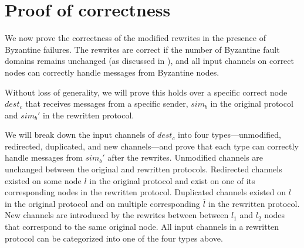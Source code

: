 \section{Proof of correctness}
\label{sec:proofs}
We now prove the correctness of the modified rewrites in the presence of Byzantine failures.
The rewrites are correct if the number of Byzantine fault domains remains unchanged (as discussed in ), 
and all input channels on correct nodes can correctly handle messages from Byzantine nodes. 


Without loss of generality, we will prove this holds over a specific correct node $dest_c$ that receives messages from a specific \randomSimulator{} sender, $sim_b$ in the original protocol and $sim_b'$ in the rewritten protocol.

We will break down the input channels of $dest_c$ into four types---unmodified, redirected, duplicated, and new channels---and prove that each type can correctly handle messages from $sim_b'$ after the rewrites. 
Unmodified channels are unchanged between the original and rewritten protocols.
Redirected channels existed on some node $l$ in the original protocol and exist on one of its corresponding nodes in the rewritten protocol.
Duplicated channels existed on $l$ in the original protocol and on multiple corresponding $\overline{l}$ in the rewritten protocol.
New channels are introduced by the rewrites between between $l_1$ and $l_2$ nodes that correspond to the same original node.
All input channels in a rewritten protocol can be categorized into one of the four types above.

